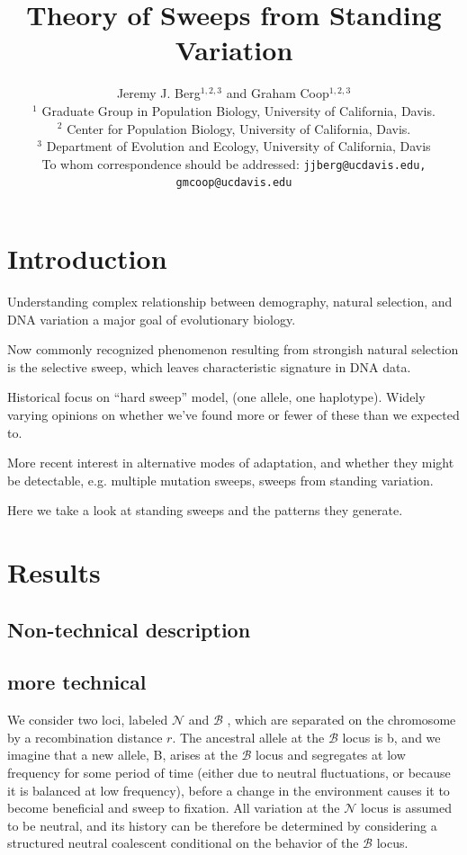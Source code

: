 \documentclass[a4paper,10pt]{article}
\title{Theory of Sweeps from Standing Variation}
\author{
Jeremy J. Berg$^{1,2,3}$ and Graham Coop$^{1,2,3}$ \\
$^1$ Graduate Group in Population Biology, University of California, Davis. \\
$^2$ Center for Population Biology, University of California, Davis.\\
$^3$ Department of Evolution and Ecology, University of California, Davis\\
\small To whom correspondence should be addressed: \texttt{jjberg@ucdavis.edu, gmcoop@ucdavis.edu}\\
}
\date{}
\newcommand{\fancyN}{$\mathcal N$ }
\newcommand{\fancyB}{$\mathcal B$ }
\begin{document}
\maketitle

\begin{abstract}
\end{abstract}

\section{Introduction}

Understanding complex relationship between demography, natural selection, and DNA variation a major goal of evolutionary biology.

Now commonly recognized phenomenon resulting from strongish natural selection is the selective sweep, which leaves characteristic signature in DNA data.

Historical focus on ``hard sweep'' model, (one allele, one haplotype). Widely varying opinions on whether we've found more or fewer of these than we expected to.

More recent interest in alternative modes of adaptation, and whether they might be detectable, e.g. multiple mutation sweeps, sweeps from standing variation.

Here we take a look at standing sweeps and the patterns they generate.

\section{Results}

\subsection{Non-technical description}



\subsection{more technical}

We consider two loci, labeled \fancyN and \fancyB, which are separated on the chromosome by a recombination distance $r$. The ancestral allele at the \fancyB locus is b, and we imagine that a new allele, B, arises at the \fancyB locus and segregates at low frequency for some period of time (either due to neutral fluctuations, or because it is balanced at low frequency), before a change in the environment causes it to become beneficial and sweep to fixation. All variation at the \fancyN locus is assumed to be neutral, and its history can be therefore be determined by considering a structured neutral coalescent conditional on the behavior of the \fancyB locus.
\end{document}
